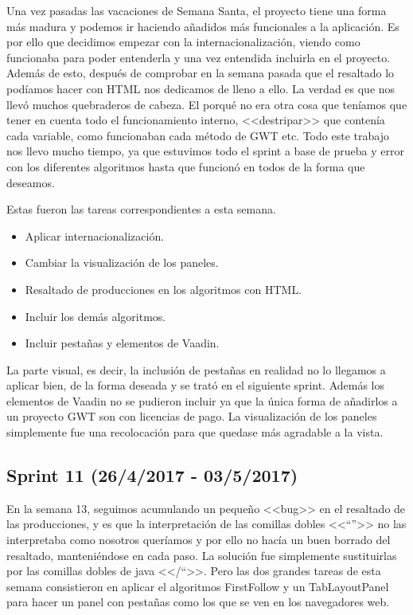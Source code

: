 Una vez pasadas las vacaciones de Semana Santa, el proyecto tiene una forma más madura y podemos ir haciendo añadidos más funcionales a la aplicación. Es por ello que decidimos empezar con la internacionalización, viendo como funcionaba para poder entenderla y una vez entendida incluirla en el proyecto. Además de esto, después de comprobar en la semana pasada que el resaltado lo podíamos hacer con HTML nos dedicamos de lleno a ello. La verdad es que nos llevó muchos quebraderos de cabeza. El porqué no era otra cosa que teníamos que tener en cuenta todo el funcionamiento interno, <<destripar>> que contenía cada variable, como funcionaban cada método de GWT etc. Todo este trabajo nos llevo mucho tiempo, ya que estuvimos todo el sprint a base de prueba y error con los diferentes algoritmos hasta que funcionó en todos de la forma que deseamos.

Estas fueron las tareas correspondientes a esta semana.

\begin{itemize}
\item Aplicar internacionalización.
\item Cambiar la visualización de los paneles.
\item Resaltado de producciones en los algoritmos con HTML.
\item Incluir los demás algoritmos.
\item Incluir pestañas y elementos de Vaadin.
\end{itemize}

La parte visual, es decir, la inclusión de pestañas en realidad no lo llegamos a aplicar bien, de la forma deseada y se trató en el siguiente sprint. Además los elementos de Vaadin no se pudieron incluir ya que la única forma de añadirlos a un proyecto GWT son con licencias de pago. La visualización de los paneles simplemente fue una recolocación para que quedase más agradable a la vista.


\subsection{Sprint 11 (26/4/2017 - 03/5/2017)}

En la semana 13, seguimos acumulando un pequeño <<bug>> en el resaltado de las producciones, y es que la interpretación de las comillas dobles <<``''>> no las interpretaba como nosotros queríamos y por ello no hacía un buen borrado del resaltado, manteniéndose en cada paso. La solución fue simplemente sustituirlas por las comillas dobles de java <</``>>. Pero las dos grandes tareas de esta semana consistieron en aplicar el algoritmos FirstFollow y un TabLayoutPanel para hacer un panel con pestañas como los que se ven en los navegadores web.

